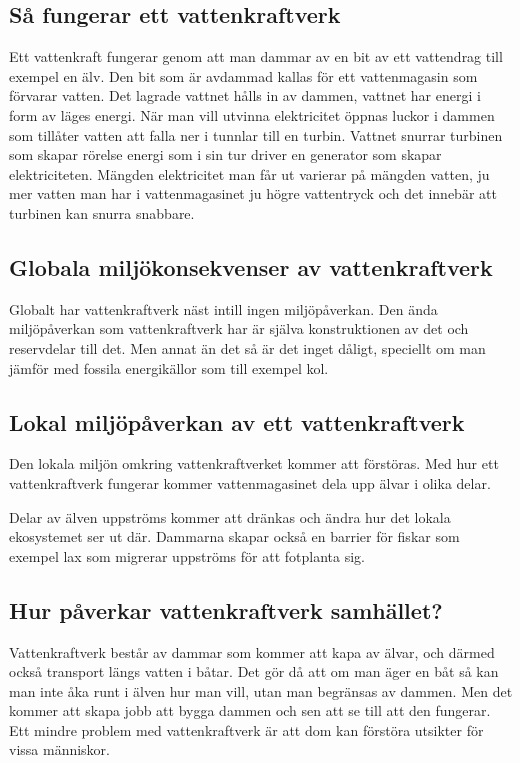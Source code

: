 \documentclass[11p]{article}
\begin{document}

    \subsection{Så fungerar ett vattenkraftverk}
    Ett vattenkraft fungerar genom att man dammar av en bit av ett vattendrag till exempel en älv.
    Den bit som är avdammad kallas för ett vattenmagasin som förvarar vatten.
    Det lagrade vattnet hålls in av dammen, vattnet har energi i form av läges energi.
    När man vill utvinna elektricitet öppnas luckor i dammen som tillåter vatten att falla ner i tunnlar till en turbin.
    Vattnet snurrar turbinen som skapar rörelse energi som i sin tur driver en generator som skapar elektriciteten.
    Mängden elektricitet man får ut varierar på mängden vatten, ju mer vatten man har i vattenmagasinet ju högre vattentryck och det innebär att turbinen kan snurra snabbare.
    \parencite{vattenfall}

    \subsection{Globala miljökonsekvenser av vattenkraftverk}
    Globalt har vattenkraftverk näst intill ingen miljöpåverkan.
    Den ända miljöpåverkan som vattenkraftverk har är själva konstruktionen av det och reservdelar till det.
    Men annat än det så är det inget dåligt, speciellt om man jämför med fossila energikällor som till exempel kol.
    \parencite{FornybaraEnergikAllorsInverkanPaDeSvenskaMiljomalen}

    \subsection{Lokal miljöpåverkan av ett vattenkraftverk}
    Den lokala miljön omkring vattenkraftverket kommer att förstöras.
    Med hur ett vattenkraftverk fungerar kommer vattenmagasinet dela upp älvar i olika delar.
    \parencite{VattenkraftForOchEmot}


    Delar av älven uppströms kommer att dränkas och ändra hur det lokala ekosystemet ser ut där.
    Dammarna skapar också en barrier för fiskar som exempel lax som migrerar uppströms för att fotplanta sig.
    \parencite{FornybaraEnergikAllorsInverkanPaDeSvenskaMiljomalen}

    \subsection{Hur påverkar vattenkraftverk samhället?}
    Vattenkraftverk består av dammar som kommer att kapa av älvar, och därmed också transport längs vatten i båtar.
    Det gör då att om man äger en båt så kan man inte åka runt i älven hur man vill, utan man begränsas av dammen.
    Men det kommer att skapa jobb att bygga dammen och sen att se till att den fungerar.
    Ett mindre problem med vattenkraftverk är att dom kan förstöra utsikter för vissa människor.
\end{document}

